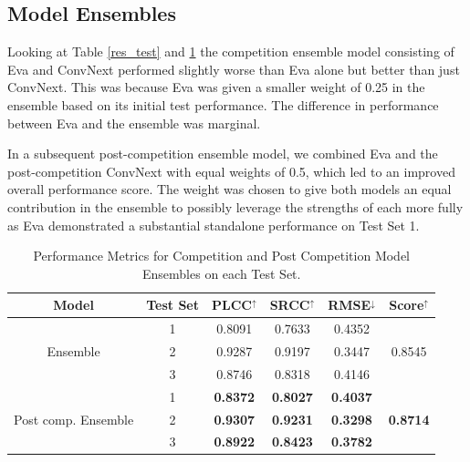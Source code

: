 \documentclass[a4paper,12pt,openright]{book}
\begin{document}
\subsection{Model Ensembles}

Looking at Table \ref{res_test} and \ref{res_ensemble} the competition ensemble model consisting of Eva and ConvNext performed slightly worse than Eva alone but better than just ConvNext. This was because Eva was given a smaller weight of 0.25 in the ensemble based on its initial test performance. The difference in performance between Eva and the ensemble was marginal.

In a subsequent post-competition ensemble model, we combined Eva and the post-competition ConvNext with equal weights of 0.5, which led to an improved overall performance score. The weight was chosen to give both models an equal contribution in the ensemble to possibly leverage the strengths of each more fully as Eva demonstrated a substantial standalone performance on Test Set 1.
\begin{table}[h]

\smallskip
\begin{center}
\begin{tabular}{ | c | c | c | c | c | c | }
\hline  
  \textbf{Model} & \textbf{Test Set} & \textbf{PLCC$^{\uparrow}$} & \textbf{SRCC$^{\uparrow}$} & \textbf{RMSE$^{\downarrow}$} &
  \textbf{Score$^{\uparrow}$}\\ 

\hline

  \multirow{3}{*}{Ensemble} & 1 & 0.8091 & 0.7633 & 0.4352 & \multirow{3}{*}{0.8545} \\
                            & 2 & 0.9287 &
                            0.9197 & 0.3447  & \\
                            & 3 & 0.8746 & 0.8318& 0.4146 & \\
                            \hline


  \multirow{3}{*}{Post comp. Ensemble} & 1 & \textbf{0.8372} & \textbf{0.8027} & \textbf{0.4037} & \multirow{3}{*}{\textbf{0.8714}} \\
                            & 2 &  \textbf{0.9307} & \textbf{0.9231} & \textbf{0.3298}  & \\
                            & 3 & \textbf{ 0.8922} & \textbf{0.8423} & \textbf{0.3782} & \\
\hline  
\end{tabular}
\end{center}
\caption{Performance Metrics for Competition and Post Competition Model Ensembles on each Test Set.}
\label{res_ensemble}
\end{table}
\newpage
\end{document}
